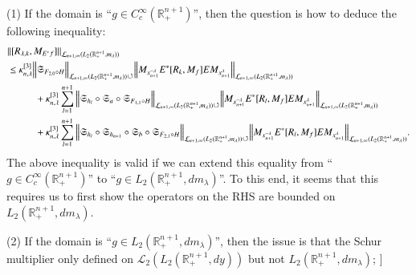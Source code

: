 \documentclass[12pt]{amsart}
\begin{document}
\begin{proposition}
{(1) If the domain is ``$g\in C_c^\infty(\mathbb{R}_+^{n+1})$'', then the question is how to deduce the following inequality:
\begin{align*}
&\|[R_{\lambda,k},M_{E^{\ast}f}]\|_{\mathcal{L}_{n+1,\infty}(L_2(\mathbb{R}^{n+1}_+,m_{\lambda}))}\\
&\leq \kappa_{n,\lambda}^{[3]}\Big\|\mathfrak{S}_{F_{2,0}\circ H}\Big\|_{\mathcal{L}_{n+1,\infty}(L_2(\mathbb{R}^{n+1}_+,m_{\lambda}))\circlearrowleft}\Big\| M_{x_{n+1}^{-\lambda}} E^{\ast}[R_k,M_f]E M_{x_{n+1}^{\lambda}}\Big\|_{\mathcal{L}_{n+1,\infty}(L_2(\mathbb{R}^{n+1}_+,m_{\lambda}))}\\
&\hspace{1.0cm}+\kappa_{n,\lambda}^{[3]}\sum_{l=1}^{n+1}\Big\|\mathfrak{S}_{h_l}\circ\mathfrak{S}_a\circ\mathfrak{S}_{F_{1,1}\circ H}\Big\|_{\mathcal{L}_{n+1,\infty}(L_2(\mathbb{R}^{n+1}_+,m_{\lambda}))\circlearrowleft}\Big\|M_{x_{n+1}^{-\lambda}} E^{\ast}[R_l,M_f]E M_{x_{n+1}^{\lambda}}\Big\|_{\mathcal{L}_{n+1,\infty}(L_2(\mathbb{R}^{n+1}_+,m_{\lambda}))}\\
&\hspace{1.0cm}+\kappa_{n,\lambda}^{[3]}\sum_{l=1}^{n+1}\Big\|\mathfrak{S}_{h_l}\circ\mathfrak{S}_{h_{n+1}}\circ\mathfrak{S}_b\circ\mathfrak{S}_{F_{2,1}\circ H}\Big\|_{\mathcal{L}_{n+1,\infty}(L_2(\mathbb{R}^{n+1}_+,m_{\lambda}))\circlearrowleft}\Big\|M_{x_{n+1}^{-\lambda}} E^{\ast}[R_l,M_f]E M_{x_{n+1}^{\lambda}}\Big\|_{\mathcal{L}_{n+1,\infty}(L_2(\mathbb{R}^{n+1}_+,m_{\lambda}))}.
\end{align*}
The above inequality is valid if we can extend this equality from ``$g\in C_c^\infty(\mathbb{R}_+^{n+1})$'' to ``$g\in L_2(\mathbb{R}_+^{n+1},dm_\lambda)$''. To this end, it seems that this requires us to first show the operators on the RHS are bounded on $L_2(\mathbb{R}_+^{n+1},dm_\lambda)$.

(2) If the domain is ``$g\in L_2(\mathbb{R}_+^{n+1},dm_\lambda)$'', then the issue is that the Schur multiplier only defined on $\mathcal{L}_2(L_2(\mathbb{R}_+^{n+1},dy))$ but not $ L_2(\mathbb{R}_+^{n+1},dm_\lambda)$;
 ]}
\end{proposition}
\end{document}
